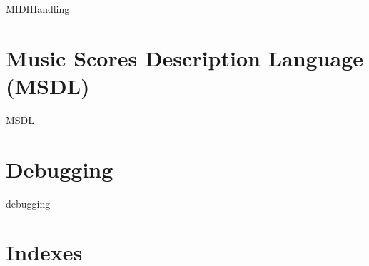\documentclass[11pt,a4paper]{report}
\begin{document}
{MIDIHandling}


\part{Music Scores Description Language (MSDL)}

{MSDL}


\part{Debugging}

{debugging}



\part{Indexes}


\fancyhead[L]{}
\fancyhead[C]{\nouppercase\leftmark}
\fancyhead[R]{}

\printindex[Files]

\printindex[Types]
\printindex[MethodsAndFields]

\printindex[ConstantsFunctionsAndVariables]

\printindex[Options]

\printindex[MusicXML]

\printindex[Main]


\end{document}
